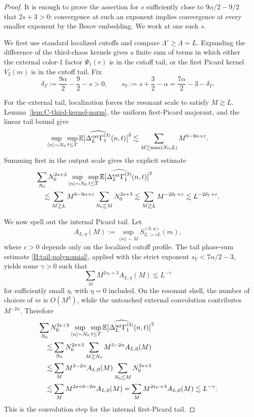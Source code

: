 \documentclass[10pt]{amsart}
\numberwithin{equation}{section}
\theoremstyle{plain}
\theoremstyle{definition}
\theoremstyle{remark}
\newcommand{\E}{\mathbb{E}}
\newcommand{\eps}{\varepsilon}
\newcommand{\la}{\langle}
\newcommand{\ra}{\rangle}
\begin{document}
\begin{proof}
It is enough to prove the assertion for \(s\) sufficiently close to \(9\alpha/2-9/2\) that \(2s+3>0\): convergence at such an exponent implies convergence at every smaller exponent by the Besov embedding.  We work at one such \(s\).

We first use standard localized cutoffs and compare \(\Lambda'\ge\Lambda=L\).  Expanding the difference of the third-chaos kernels gives a finite sum of terms in which either the external color-1 factor \(\Psi_1(r)\) is in the cutoff tail, or the first Picard kernel \(V_2(m)\) is in the cutoff tail.  Fix
\[
        \delta_\Gamma:=\frac{9\alpha}{2}-\frac92-s>0,
        \qquad
        s_V:=s+\frac32-\alpha
             =\frac{7\alpha}{2}-3-\delta_\Gamma.
\]

For the external tail, localization forces the resonant scale to satisfy \(M\gtrsim L\).  Lemma~\ref{lem:C-third-kernel-norm}, the uniform first-Picard majorant, and the linear tail bound give
\[
 \sup_{\la n\ra\sim N_0}\sup_{t\le T}
 \E\bigl|\widehat{\Delta_L^{\rm ext}\Gamma_1^{(3)}}(n,t)\bigr|^2
 \lesssim
 \sum_{M\gtrsim\max(N_0,L)}M^{6-9\alpha+\eps}.
\]
Summing first in the output scale gives the explicit estimate
\begin{align}
 &\sum_{N_0}N_0^{2s+3}
 \sup_{\la n\ra\sim N_0}\sup_{t\le T}
 \E\bigl|\widehat{\Delta_L^{\rm ext}\Gamma_1^{(3)}}(n,t)\bigr|^2
 \notag\\
 &\quad\lesssim
 \sum_{M\gtrsim L}M^{6-9\alpha+\eps}
       \sum_{N_0\lesssim M}N_0^{2s+3}
 \lesssim
 \sum_{M\gtrsim L}M^{-2\delta_\Gamma+\eps}
 \lesssim L^{-2\delta_\Gamma+\eps}.
\label{C:third-external-tail-sum}
\end{align}

We now spell out the internal Picard tail.  Let
\[
 A_{L,\eta}(M):=
 \sup_{\la m\ra\sim M}S_{2,>cL}^{(0,\eta)}(m),
\]
where \(c>0\) depends only on the localized cutoff profile.  The tail phase-sum estimate \eqref{B:tail-polynomial}, applied with the strict exponent \(s_V<7\alpha/2-3\), yields some \(\gamma>0\) such that
\begin{equation}\label{C:internal-picard-tail-input}
        \sum_M M^{2s_V+3}A_{L,\eta}(M)
        \lesssim L^{-\gamma}
\end{equation}
for sufficiently small \(\eta\), with \(\eta=0\) included.  On the resonant shell, the number of choices of \(m\) is \(O(M^3)\), while the untouched external convolution contributes \(M^{-2\alpha}\).  Therefore
\begin{align}
 &\sum_{N_0}N_0^{2s+3}
 \sup_{\la n\ra\sim N_0}\sup_{t\le T}
 \E\bigl|\widehat{\Delta_L^{\rm int}\Gamma_1^{(3)}}(n,t)\bigr|^2
 \notag\\
 &\quad\lesssim
 \sum_{N_0}N_0^{2s+3}
       \sum_{M\gtrsim N_0}M^{3-2\alpha}A_{L,0}(M) \notag\\
 &\quad\lesssim
 \sum_M M^{3-2\alpha}A_{L,0}(M)
       \sum_{N_0\lesssim M}N_0^{2s+3} \notag\\
 &\quad\lesssim
 \sum_M M^{2s+6-2\alpha}A_{L,0}(M)
 =
 \sum_M M^{2s_V+3}A_{L,0}(M)
 \lesssim L^{-\gamma}.
\label{C:third-internal-tail-sum}
\end{align}
This is the convolution step for the internal first-Picard tail.


\end{proof}
\end{document}
